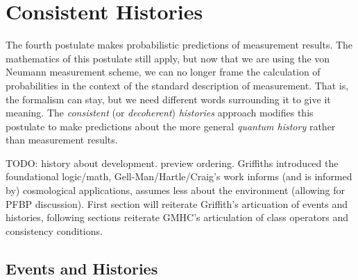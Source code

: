 \usetikzlibrary{shapes.geometric}
\usetikzlibrary{positioning}

\chapter{Consistent Histories}

The fourth postulate makes probabilistic predictions of measurement results. The mathematics of this postulate still apply, but now that we are using the von Neumann measurement scheme, we can no longer frame the calculation of probabilities in the context of the standard description of measurement. That is, the formalism can stay, but we need different words surrounding it to give it meaning. The \textit{consistent} (or \textit{decoherent}) \textit{histories} approach modifies this postulate to make predictions about the more general \textit{quantum history} rather than measurement results.

TODO: history about development. preview ordering. Griffiths introduced the foundational logic/math,  Gell-Man/Hartle/Craig's work informs (and is informed by) cosmological applications, assumes less about the environment (allowing for PFBP discussion). First section will reiterate Griffith's articuation of events and histories, following sections reiterate GMHC's articulation of class operators and consistency conditions.


%

\section{Events and Histories}

